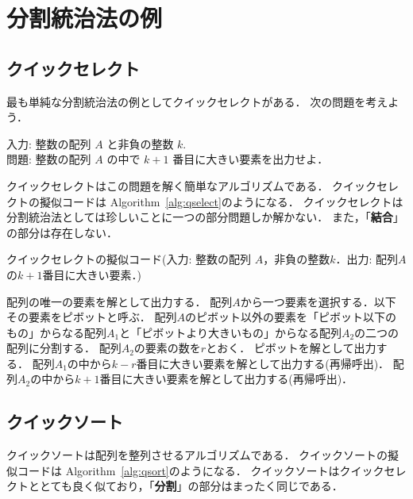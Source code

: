 \documentclass[a4paper,twoside,onecolumn,openany,article]{memoir}
\theoremstyle{remark}
\begin{document}
\section{分割統治法の例}
\subsection{クイックセレクト}
最も単純な分割統治法の例としてクイックセレクトがある．
次の問題を考えよう．

\vspace{1em}
\noindent
入力: 整数の配列 $A$ と非負の整数 $k$.\\
問題: 整数の配列 $A$ の中で $k+1$ 番目に大きい要素を出力せよ．

\vspace{1em}
\noindent
クイックセレクトはこの問題を解く簡単なアルゴリズムである．
クイックセレクトの擬似コードは Algorithm~\ref{alg:qselect}のようになる．
クイックセレクトは分割統治法としては珍しいことに一つの部分問題しか解かない．
また，「\textbf{結合}」の部分は存在しない．

\begin{algorithm}
\caption{クイックセレクトの擬似コード(入力: 整数の配列 $A$，非負の整数$k$．出力: 配列$A$の$k+1$番目に大きい要素．)}
\label{alg:qselect}
\begin{algorithmic}
  \State 配列の唯一の要素を解として出力する．
\Else
  \State 配列$A$から一つ要素を選択する．以下その要素をピボットと呼ぶ．
  \State 配列$A$のピボット以外の要素を「ピボット以下のもの」からなる配列$A_1$と「ピボットより大きいもの」からなる配列$A_2$の二つの配列に分割する．
  \State 配列$A_2$の要素の数を$r$とおく．
    \State ピボットを解として出力する．
    \State 配列$A_1$の中から$k-r$番目に大きい要素を解として出力する(再帰呼出)．
  \Else
    \State 配列$A_2$の中から$k+1$番目に大きい要素を解として出力する(再帰呼出)．
  \EndIf
\EndIf
\end{algorithmic}
\end{algorithm}


\subsection{クイックソート}
クイックソートは配列を整列させるアルゴリズムである．
クイックソートの擬似コードは Algorithm~\ref{alg:qsort}のようになる．
クイックソートはクイックセレクトととても良く似ており，「\textbf{分割}」の部分はまったく同じである．
\end{document}
